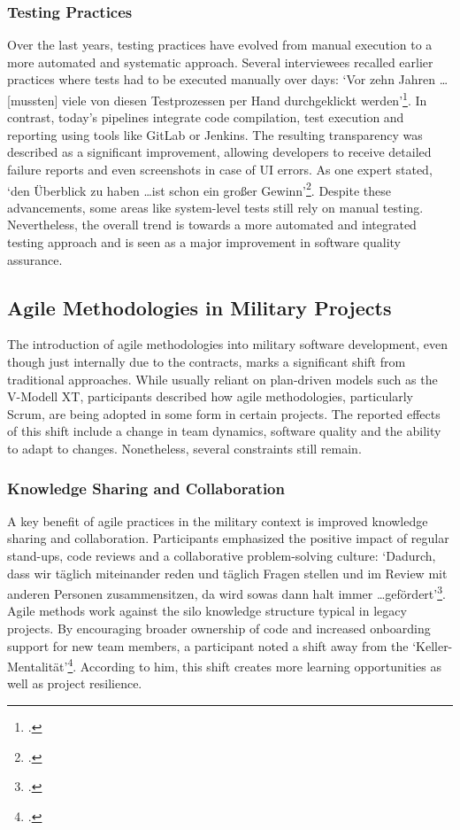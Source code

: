 \subsubsection{Testing Practices}
Over the last years, testing practices have evolved from manual execution to a more automated and systematic approach. Several interviewees recalled earlier practices where tests had to be executed manually over days: `Vor zehn Jahren \ldots [mussten] viele von diesen Testprozessen per Hand durchgeklickt werden'\footcite{Interview22025}. In contrast, today's pipelines
integrate code compilation, test execution and reporting using tools like GitLab or Jenkins.
The resulting transparency was described as a significant improvement, allowing developers to receive detailed failure reports and even screenshots in case of \ac{UI} errors. As one expert stated, `den Überblick zu haben \ldots ist schon ein großer Gewinn'\footcite{Interview12025}.
Despite these advancements, some areas like system-level tests still rely on manual testing. Nevertheless, the overall trend is towards a more automated and integrated testing approach and is seen as a major improvement in software quality assurance.

\subsection{Agile Methodologies in Military Projects}
The introduction of agile methodologies into military software development, even though just internally due to the contracts, marks a significant shift from traditional approaches. While usually reliant on plan-driven models such as the V-Modell XT, participants described how agile methodologies, particularly Scrum, are being adopted in some form in certain projects.
The reported effects of this shift include a change in team dynamics, software quality and the ability to adapt to changes. Nonetheless, several constraints still remain.

\subsubsection{Knowledge Sharing and Collaboration}
A key benefit of agile practices in the military context is improved knowledge sharing and collaboration. Participants emphasized the positive impact of regular stand-ups, code reviews and a collaborative problem-solving culture: `Dadurch, dass wir täglich miteinander reden und täglich Fragen stellen und im Review mit anderen 
Personen zusammensitzen, da wird sowas dann halt immer \ldots gefördert'\footcite{Interview32025}. Agile methods work against the silo knowledge structure typical in legacy projects. By encouraging broader ownership of code and increased onboarding support for new team members, a participant noted a shift away from the `Keller-Mentalität'\footcite{Interview22025}. According to him,
this shift creates more learning opportunities as well as project resilience.

